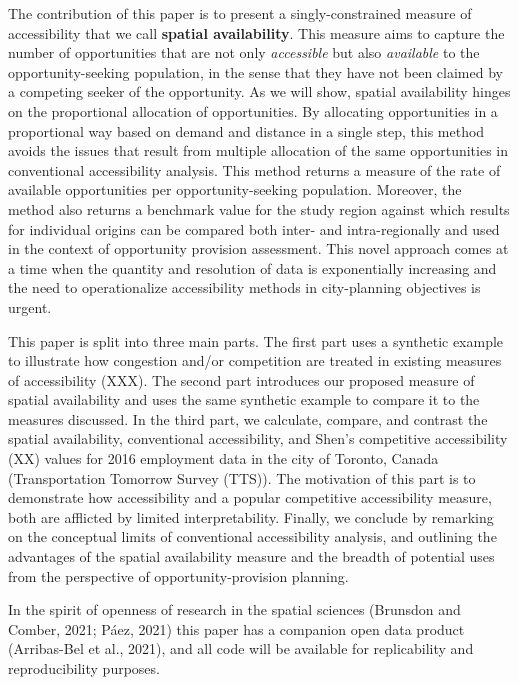 \documentclass[]{elsarticle} %
\begin{document}
The contribution of this paper is to present a singly-constrained
measure of accessibility that we call \textbf{spatial availability}.
This measure aims to capture the number of opportunities that are not
only \emph{accessible} but also \emph{available} to the
opportunity-seeking population, in the sense that they have not been
claimed by a competing seeker of the opportunity. As we will show,
spatial availability hinges on the proportional allocation of
opportunities. By allocating opportunities in a proportional way based
on demand and distance in a single step, this method avoids the issues
that result from multiple allocation of the same opportunities in
conventional accessibility analysis. This method returns a measure of
the rate of available opportunities per opportunity-seeking population.
Moreover, the method also returns a benchmark value for the study region
against which results for individual origins can be compared both inter-
and intra-regionally and used in the context of opportunity provision
assessment. This novel approach comes at a time when the quantity and
resolution of data is exponentially increasing and the need to
operationalize accessibility methods in city-planning objectives is
urgent.

This paper is split into three main parts. The first part uses a
synthetic example to illustrate how congestion and/or competition are
treated in existing measures of accessibility (XXX). The second part
introduces our proposed measure of spatial availability and uses the
same synthetic example to compare it to the measures discussed. In the
third part, we calculate, compare, and contrast the spatial
availability, conventional accessibility, and Shen's competitive
accessibility (XX) values for 2016 employment data in the city of
Toronto, Canada (Transportation Tomorrow Survey (TTS)). The motivation
of this part is to demonstrate how accessibility and a popular
competitive accessibility measure, both are afflicted by limited
interpretability. Finally, we conclude by remarking on the conceptual
limits of conventional accessibility analysis, and outlining the
advantages of the spatial availability measure and the breadth of
potential uses from the perspective of opportunity-provision planning.

In the spirit of openness of research in the spatial sciences (Brunsdon
and Comber, 2021; Páez, 2021) this paper has a companion open data
product (Arribas-Bel et al., 2021), and all code will be available for
replicability and reproducibility purposes.
\end{document}
